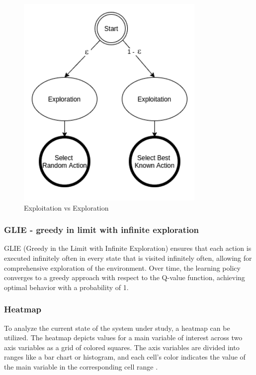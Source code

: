 \documentclass{article}
\begin{document}
\begin{figure}[h]
	\centering
	\includegraphics[width=0.5\linewidth]{../data/images/exp_e.png}
	\caption{Exploitation vs Exploration \cite{q_le}}
	\label{fig:expl}
\end{figure}

\subsubsection{GLIE - greedy in limit with infinite exploration}
GLIE (Greedy in the Limit with Infinite Exploration) ensures that each action is executed infinitely often in every state that is visited infinitely often, allowing for comprehensive exploration of the environment. Over time, the learning policy converges to a greedy approach with respect to the Q-value function, achieving optimal behavior with a probability of 1.


\subsubsection{Heatmap}
To analyze the current state of the system under study, a heatmap can be utilized. The heatmap depicts values for a main variable of interest across two axis variables as a grid of colored squares. The axis variables are divided into ranges like a bar chart or histogram, and each cell’s color indicates the value of the main variable in the corresponding cell range \cite{heatmap}. \\ 
\end{document}
